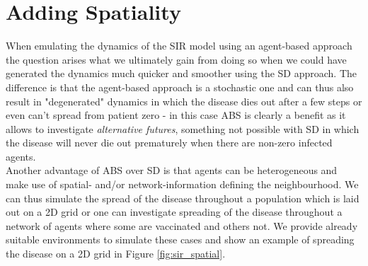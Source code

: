 \section{Adding Spatiality}
When emulating the dynamics of the SIR model using an agent-based approach the question arises what we ultimately gain from doing so when we could have generated the dynamics much quicker and smoother using the SD approach. The difference is that the agent-based approach is a stochastic one and can thus also result in "degenerated" dynamics in which the disease dies out after a few steps or even can't spread from patient zero - in this case ABS is clearly a benefit as it allows to investigate \textit{alternative futures}, something not possible with SD in which the disease will never die out prematurely when there are non-zero infected agents. \\
Another advantage of ABS over SD is that agents can be heterogeneous and make use of spatial- and/or network-information defining the neighbourhood. We can thus simulate the spread of the disease throughout a population which is laid out on a 2D grid or one can investigate spreading of the disease throughout a network of agents where some are vaccinated and others not. We provide already suitable environments to simulate these cases and show an example of spreading the disease on a 2D grid in Figure \ref{fig:sir_spatial}.  

